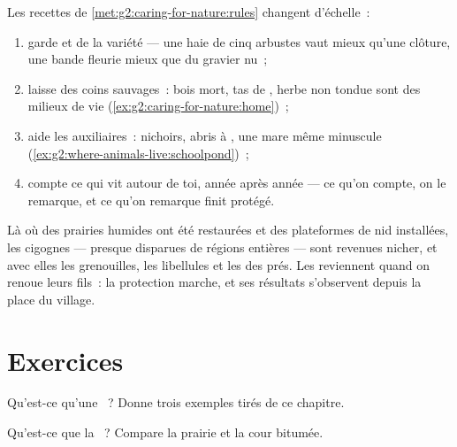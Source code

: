 \begin{method}\label{met:g5:biodiversity:help}
Les recettes de \cref{met:g2:caring-for-nature:rules} changent
d'échelle~:
\begin{enumerate}
  \item garde et  de la variété --- une haie de cinq
        arbustes vaut mieux qu'une clôture, une bande fleurie
        mieux que du gravier nu~;
  \item laisse des coins sauvages~: bois mort, tas de ,
        herbe non tondue sont des milieux de vie
        (\cref{ex:g2:caring-for-nature:home})~;
  \item aide les auxiliaires~: nichoirs, abris à , une
        mare même minuscule
        (\cref{ex:g2:where-animals-live:schoolpond})~;
  \item compte ce qui vit autour de toi, année après année ---
        ce qu'on compte, on le remarque, et ce qu'on remarque
        finit protégé.
\end{enumerate}
\end{method}

\begin{example}\label{ex:g5:biodiversity:storks}
Là où des prairies humides ont été restaurées et des plateformes de
nid installées, les cigognes --- presque disparues de régions
entières --- sont revenues nicher, et avec elles les grenouilles,
les libellules et les  des prés. Les  reviennent quand
on renoue leurs fils~: la protection marche, et ses résultats
s'observent depuis la place du village.
\end{example}

\section{Exercices}

\begin{exercise}[$\star$]\label{exo:g5:biodiversity:1}
Qu'est-ce qu'une ~? Donne trois exemples tirés de ce chapitre.
\end{exercise}

\begin{exercise}[$\star$]\label{exo:g5:biodiversity:2}
Qu'est-ce que la ~? Compare la prairie et la cour
bitumée.
\end{exercise}

